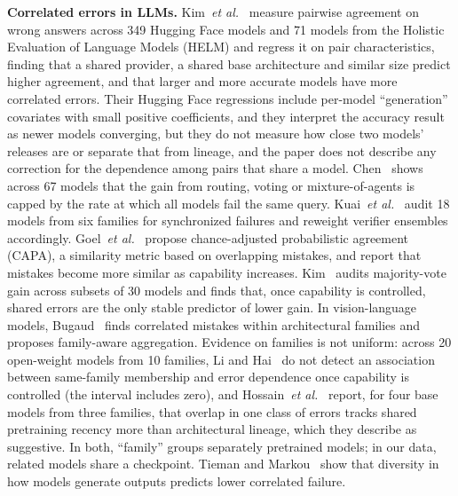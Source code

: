 \documentclass{ieeeaccess}
\theoremstyle{definition}
\theoremstyle{plain}
\begin{document}
\textbf{Correlated errors in LLMs.} Kim~\textit{et al.}~\cite{kim2025} measure pairwise agreement on wrong answers across 349 Hugging Face models and 71 models from the Holistic Evaluation of Language Models (HELM) and regress it on pair characteristics, finding that a shared provider, a shared base architecture and similar size predict higher agreement, and that larger and more accurate models have more correlated errors. Their Hugging Face regressions include per-model ``generation'' covariates with small positive coefficients, and they interpret the accuracy result as newer models converging, but they do not measure how close two models' releases are or separate that from lineage, and the paper does not describe any correction for the dependence among pairs that share a model. Chen~\cite{chen2026} shows across 67 models that the gain from routing, voting or mixture-of-agents is capped by the rate at which all models fail the same query. Kuai~\textit{et al.}~\cite{kuai2026} audit 18 models from six families for synchronized failures and reweight verifier ensembles accordingly. Goel~\textit{et al.}~\cite{goel2025} propose chance-adjusted probabilistic agreement (CAPA), a similarity metric based on overlapping mistakes, and report that mistakes become more similar as capability increases. Kim~\cite{kimd2026} audits majority-vote gain across subsets of 30 models and finds that, once capability is controlled, shared errors are the only stable predictor of lower gain. In vision-language models, Bugaud~\cite{bugaud2026} finds correlated mistakes within architectural families and proposes family-aware aggregation. Evidence on families is not uniform: across 20 open-weight models from 10 families, Li and Hai~\cite{lihai2026} do not detect an association between same-family membership and error dependence once capability is controlled (the interval includes zero), and Hossain~\textit{et al.}~\cite{hossain2026} report, for four base models from three families, that overlap in one class of errors tracks shared pretraining recency more than architectural lineage, which they describe as suggestive. In both, ``family'' groups separately pretrained models; in our data, related models share a checkpoint. Tieman and Markou~\cite{tieman2026} show that diversity in how models generate outputs predicts lower correlated failure.
\end{document}
